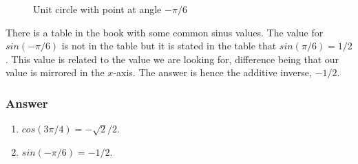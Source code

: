 \begin{enumerate}[label=(\alph*)]
\begin{figure}[H]
      \caption{Unit circle with point at angle $ -\pi/6 $}
      \label{figure:checkpoint-1.1.18-b}
    \end{figure}

    There is a table in the book with some common sinus values. The value for $ sin(-\pi/6) $ is not in the table but it is stated in the table that $ sin(\pi/6) = 1/2 $. This value is related to the value we are looking for, difference being that our value is mirrored in the $x$-axis. The answer is hence the additive inverse, $-1/2$.
\end{enumerate}

\subsubsection*{Answer}

\begin{enumerate}[label=(\alph*)]
  \item
    $ cos(3\pi/4) = -\sqrt{2}/2 $.
  \item
    $ sin(-\pi/6) = -1/2 $.
\end{enumerate}

